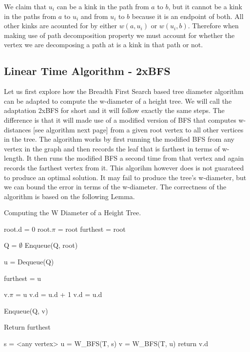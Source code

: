 We claim that $u_i$ can be a kink in the path from $a$ to $b$, but it cannot be a kink in the paths from $a$ to $u_i$ and from $u_i$ to $b$ because it is an endpoint of both. All other kinks are acounted for by either $w(a, u_i)$ or $w(u_i, b)$. Therefore when making use of path decomposition property we must account for whether the vertex we are decomposing a path at is a kink in that path or not.


\subsection{Linear Time Algorithm - 2xBFS}

Let us first explore how the Breadth First Search based tree diameter algorithm can be adapted to compute the w-diameter of a height tree. We will call the adaptation 2xBFS for short and it will follow exactly the same steps. The difference is that it will made use of a modified version of BFS that computes w-distances [see algorithm next page] from a given root vertex to all other vertices in the tree. The algorithm works by first running the modified BFS from any vertex in the graph and then records the leaf that is farthest in terms of w-length. It then runs the modified BFS a second time from that vertex and again records the farthest vertex from it. This algorihm however does is not guarateed to produce an optimal solution. It may fail to produce the tree's w-diameter, but we can bound the error in terms of the w-diameter. The correctness of the algorithm is based on the following Lemma.

\begin{algorithm}
\caption{Computing the W Diameter of a Height Tree.}

\begin{algorithmic}[1]

    \State root.d = 0
    \State root.$\pi$ = root
    \State furthest = root

    \State Q = $\emptyset$
    \State Enqueue(Q, root)

        \State u = Dequeue(Q)

            \State furthest = u
        \EndIf

                \State v.$\pi$ = u
                    \State v.d = u.d + 1
                \Else
                    \State v.d = u.d
                \EndIf

                \State Enqueue(Q, v)

            \EndIf
        \EndFor
    \EndWhile
    \State Return furthest
\EndFunction

    \State s = <any vertex>
    \State u = W\_BFS(T, s)
    \State v = W\_BFS(T, u)
    \State return v.d
\EndFunction

\end{algorithmic}
\end{algorithm}



